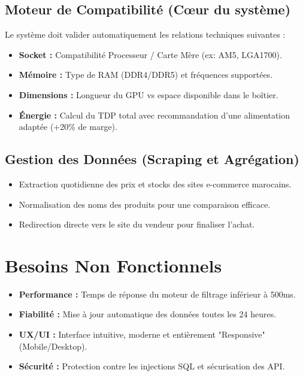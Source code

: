 \documentclass[12pt,a4paper]{article}
\begin{document}
\subsection{Moteur de Compatibilité (Cœur du système)}
Le système doit valider automatiquement les relations techniques suivantes :
\begin{itemize}[label=\textbullet]
\item \textbf{Socket :} Compatibilité Processeur / Carte Mère (ex: AM5, LGA1700).
\item \textbf{Mémoire :} Type de RAM (DDR4/DDR5) et fréquences supportées.
\item \textbf{Dimensions :} Longueur du GPU vs espace disponible dans le boîtier.
\item \textbf{Énergie :} Calcul du TDP total avec recommandation d'une alimentation adaptée (+20\% de marge).
\end{itemize}

\subsection{Gestion des Données (Scraping et Agrégation)}
\begin{itemize}[label=\textbullet]
\item Extraction quotidienne des prix et stocks des sites e-commerce marocains.
\item Normalisation des noms des produits pour une comparaison efficace.
\item Redirection directe vers le site du vendeur pour finaliser l'achat.
\end{itemize}

\section{Besoins Non Fonctionnels}
\begin{itemize}[label=\textbullet]
\item \textbf{Performance :} Temps de réponse du moteur de filtrage inférieur à 500ms.
\item \textbf{Fiabilité :} Mise à jour automatique des données toutes les 24 heures.
\item \textbf{UX/UI :} Interface intuitive, moderne et entièrement "Responsive" (Mobile/Desktop).
\item \textbf{Sécurité :} Protection contre les injections SQL et sécurisation des API.
\end{itemize}
\end{document}
